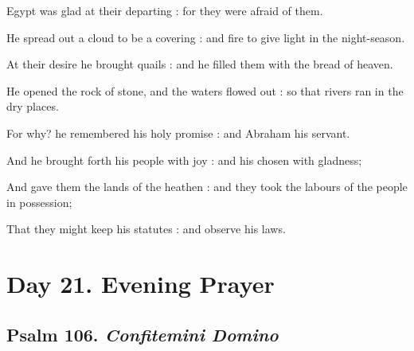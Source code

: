Egypt was glad at their departing : for they were afraid of them.\par
{}He spread out a cloud to be a covering : and fire to give light in the night-season.\par
{}At their desire he brought quails : and he filled them with the bread of heaven.\par
{}He opened the rock of stone, and the waters flowed out : so that rivers ran in the dry places.\par
{}For why? he remembered his holy promise : and Abraham his servant.\par
{}And he brought forth his people with joy : and his chosen with gladness;\par
{}And gave them the lands of the heathen : and they took the labours of the people in possession;\par
{}That they might keep his statutes : and observe his laws.\par

\section*{Day 21. Evening Prayer}

\subsection{Psalm 106. \textit{Confitemini Domino}}

